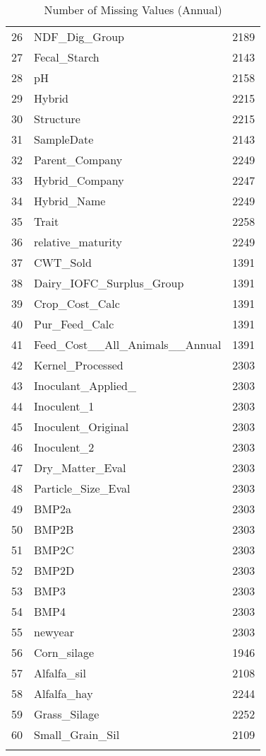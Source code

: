 \documentclass[12pt,]{article}
\begin{document}
\begin{Schunk}
\begin{longtable}{rlr}
  26 & NDF\_Dig\_Group & 2189 \\ 
  27 & Fecal\_Starch & 2143 \\ 
  28 & pH & 2158 \\ 
  29 & Hybrid & 2215 \\ 
  30 & Structure & 2215 \\ 
  31 & SampleDate & 2143 \\ 
  32 & Parent\_Company & 2249 \\ 
  33 & Hybrid\_Company & 2247 \\ 
  34 & Hybrid\_Name & 2249 \\ 
  35 & Trait & 2258 \\ 
  36 & relative\_maturity & 2249 \\ 
  37 & CWT\_Sold & 1391 \\ 
  38 & Dairy\_IOFC\_Surplus\_Group & 1391 \\ 
  39 & Crop\_Cost\_Calc & 1391 \\ 
  40 & Pur\_Feed\_Calc & 1391 \\ 
  41 & Feed\_Cost\_\_All\_Animals\_\_Annual & 1391 \\ 
  42 & Kernel\_Processed & 2303 \\ 
  43 & Inoculant\_Applied\_ & 2303 \\ 
  44 & Inoculent\_1 & 2303 \\ 
  45 & Inoculent\_Original & 2303 \\ 
  46 & Inoculent\_2 & 2303 \\ 
  47 & Dry\_Matter\_Eval & 2303 \\ 
  48 & Particle\_Size\_Eval & 2303 \\ 
  49 & BMP2a & 2303 \\ 
  50 & BMP2B & 2303 \\ 
  51 & BMP2C & 2303 \\ 
  52 & BMP2D & 2303 \\ 
  53 & BMP3 & 2303 \\ 
  54 & BMP4 & 2303 \\ 
  55 & newyear & 2303 \\ 
  56 & Corn\_silage & 1946 \\ 
  57 & Alfalfa\_sil & 2108 \\ 
  58 & Alfalfa\_hay & 2244 \\ 
  59 & Grass\_Silage & 2252 \\ 
  60 & Small\_Grain\_Sil & 2109 \\ 
   \hline
\hline
\caption{Number of Missing Values (Annual)} 
\label{Table-5}
\end{longtable}
\endgroup\end{Schunk}
\end{document}

